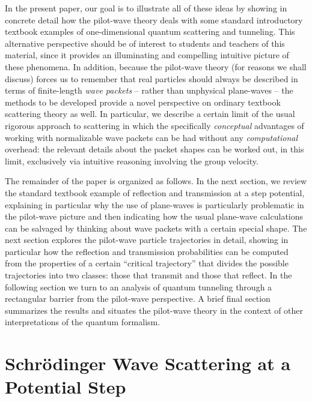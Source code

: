 \documentclass[aps,prc,twocolumn,letterpaper,floatfix]{revtex4}
\begin{document}
In the present paper, our goal is to illustrate all of these ideas by
showing in concrete detail how the pilot-wave theory deals with some
standard introductory textbook examples of one-dimensional quantum
scattering and tunneling.  This alternative perspective should be of
interest to students and teachers of this material, since it provides
an illuminating and compelling intuitive picture of these phenomena.
In addition, because the pilot-wave theory (for reasons we shall
discuss) forces us to remember that real particles should always
be described in terms of finite-length \emph{wave packets} -- rather
than unphysical plane-waves -- the methods to be developed provide a
novel perspective on ordinary textbook scattering theory as well.  In
particular, we describe a certain limit of the usual rigorous
approach to scattering \cite{scattering} in
which the specifically \emph{conceptual} advantages of working with
normalizable wave packets can be had without any \emph{computational}
overhead:  the relevant details about the packet shapes can be worked
out, in this limit, exclusively via intuitive reasoning involving the group velocity.




The remainder of the paper is organized as follows.  In the next
section, we review the standard textbook example of reflection and
transmission at a step potential, explaining in particular why the use
of plane-waves is particularly problematic in the pilot-wave picture
and then indicating how the usual plane-wave calculations can
be salvaged by thinking about wave packets with a certain special shape.
The
next section explores the pilot-wave particle trajectories in detail,
showing in particular how the reflection and transmission
probabilities can be computed from the properties of a certain
``critical trajectory'' \cite{uu} that divides the possible trajectories into
two classes:  those that transmit and those that reflect.  In the
following section we turn to an analysis of quantum tunneling through
a rectangular barrier from the pilot-wave perspective.  
A brief final section summarizes the results and situates the
pilot-wave theory in the context of other interpretations of the
quantum formalism.




\section{Schr\"odinger Wave Scattering at a Potential Step}
\end{document}
